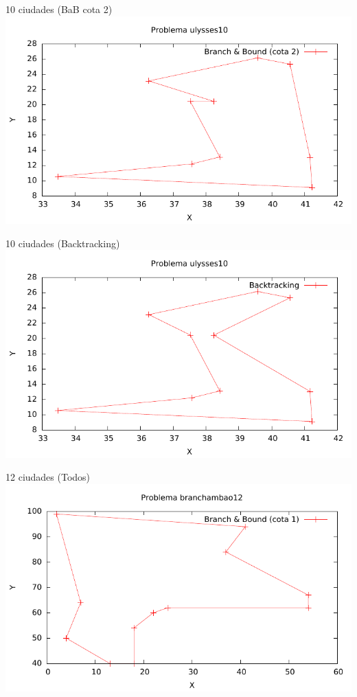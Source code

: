 \begin{frame}{10 ciudades (BaB cota 2)}
	\includegraphics[width=\textwidth]{img/ulysses10_tsp_2}
\end{frame}

\begin{frame}{10 ciudades (Backtracking)}
	\includegraphics[width=\textwidth]{img/ulysses10_tsp_3}
\end{frame}

\begin{frame}{12 ciudades (Todos)}
	\includegraphics[width=\textwidth]{img/branchambao12_tsp_1}
\end{frame}

